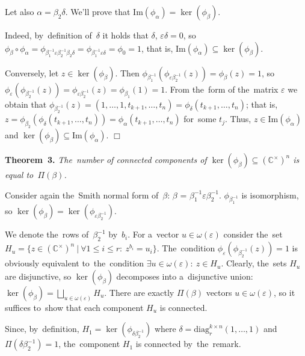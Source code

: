 \documentclass[twoside]{article}
\begin{document}
    Let also $\alpha = \beta_2 \delta$. We'll prove that $\mathrm{Im}(\phi_\alpha) = \ker(\phi_\beta)$.

    Indeed, by~definition of~$\delta$ it holds that $\delta$, $\varepsilon \delta = 0$, so $\phi_{\beta} \circ \phi_{\alpha} = \phi_{\beta_1^{-1} \varepsilon \beta_2^{-1} \beta_2 \delta} = \phi_{\beta_1^{-1} \varepsilon \delta} = \phi_{0} = 1$,
    that is, $\mathrm{Im}(\phi_{\alpha}) \subseteq \ker(\phi_{\beta})$.

    Conversely, let $z \in \ker(\phi_\beta)$. Then $\phi_{\beta_1^{-1}} (\phi_{\varepsilon \beta_2^{-1}}(z)) = \phi_\beta(z) = 1$,
    so $\phi_{\varepsilon}(\phi_{\beta_2^{-1}}(z)) = \phi_{\varepsilon \beta_2^{-1}}(z) = \phi_{\beta_1}(1) = 1$.
    From the~form of the~matrix $\varepsilon$ we obtain that
    $
        \phi_{\beta_2^{-1}}(z) = (1,\allowbreak \ldots,\allowbreak 1,\allowbreak t_{k + 1},\allowbreak \ldots, t_n) = \phi_\delta(t_{k + 1}, \ldots, t_n)
    $; that is, $z = \phi_{\beta_2}(\phi_\delta(t_{k + 1}, \ldots, t_n)) = \phi_\alpha(t_{k + 1}, \ldots, t_n)$ for~some $t_j$.
    Thus, $z \in \mathrm{Im}(\phi_\alpha)$ and $\ker(\phi_\beta) \subseteq \mathrm{Im}(\phi_\alpha)$.
\hfill$\Box$\medskip

\medskip\noindent\textbf{Theorem~3.}\emph{
    The~number of connected components of $\ker(\phi_\beta) \subseteq ({\mathbb{C}^\times})^n$ is equal to~$\Pi(\beta)$.
}\medskip

    Consider again the~Smith normal form of~$\beta$: $\beta$ = $\beta_1^{-1} \varepsilon \beta_2^{-1}$.
    $\phi_{\beta_1^{-1}}$ is isomorphism, so $\ker(\phi_{\beta}) = \ker(\phi_{\varepsilon \beta_2^{-1}})$.

    We denote the~rows of~$\beta_2^{-1}$ by~$b_i$. For a~vector $u \in \omega(\varepsilon)$ consider
    the~set $H_u = \{z \in ({\mathbb{C}^\times})^n \ | \ \forall 1 \leq i \leq r{:}\ z^{b_i} = u_i\}$.
    The~condition $\phi_\varepsilon(\phi_{\beta_2^{-1}}(z)) = 1$ is obviously equivalent to~the~condition
    $\exists u \in \omega(\varepsilon){:}\ z \in H_u$. Clearly, the~sets $H_u$ are disjunctive,
    so $\ker(\phi_{\beta})$ decomposes into a~disjunctive union:
    $
        \ker(\phi_{\beta}) = \bigsqcup_{u \in \omega(\varepsilon)} H_u.
    $
    There are exactly $\Pi(\beta)$ vectors $u \in \omega(\varepsilon)$, so it suffices to~show that
    each component $H_u$ is connected.

    Since, by~definition, $H_1 = \ker(\phi_{\delta \beta_2^{-1}})$ where $\delta = \mathrm{diag}^{k \times n}_r(1, \ldots, 1)$
    and $\Pi(\delta \beta_2^{-1}) = 1$, the~component $H_1$ is connected by~the~remark.
\end{document}
